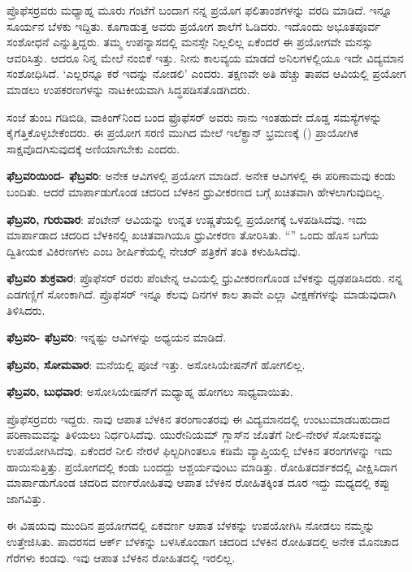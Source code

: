 ಪ್ರೊಫೆಸರ್‍ರವರು ಮಧ್ಯಾಹ್ನ ಮೂರು ಗಂಟೆಗೆ ಬಂದಾಗ ನನ್ನ ಪ್ರಯೊಗ ಫಲಿತಾಂಶಗಳನ್ನು ವರದಿ ಮಾಡಿದೆ. ಇನ್ನೂ ಸೂರ್ಯನ ಬೆಳಕು ಇದ್ದಿತು. ಕೂಗಾಡುತ್ತ ಅವರು ಪ್ರಯೋಗ ಶಾಲೆಗೆ ಓಡಿದರು. ಇದೊಂದು ಅಭೂತಪೂರ್ವ ಸಂಶೋಧನೆ ಎನ್ನುತ್ತಿದ್ದರು. ತಮ್ಮ ಉಪನ್ಯಾಸದಲ್ಲಿ ಮನಸ್ಸೇ ನಿಲ್ಲಲಿಲ್ಲ ಏಕೆಂದರೆ ಈ ಪ್ರಯೋಗವೇ ಮನಸ್ಸು ಆವರಿಸಿತ್ತು. ಆದರೂ ನಿನ್ನ ಮೇಲೆ ನಂಬಿಕೆ ಇತ್ತು. ನೀನು ಕಾಲವ್ಯಯ ಮಾಡದೆ ಅನಿಲಗಳಲ್ಲಿಯೂ ಇದೇ ವಿದ್ಯಮಾನ ಸಂಶೋಧಿಸಿದೆ. ‘ಎಲ್ಲರನ್ನೂ ಕರೆ ಇದನ್ನು ನೋಡಲಿ’ ಎಂದರು. ತಕ್ಷಣವೇ ಅತಿ ಹೆಚ್ಚು ತಾಪದ ಆವಿಯಲ್ಲಿ ಪ್ರಯೋಗ ಮಾಡಲು ಉಪಕರಣಗಳನ್ನು ನಾಟಕೀಯವಾಗಿ ಸಿದ್ಧಪಡಿಸತೊಡಗಿದರು.

ಸಂಜೆ ತುಂಬ ಗಡಿಬಿಡಿ, ವಾಕಿಂಗ್‍ನಿಂದ ಬಂದ ಫ್ರೊಫೆಸರ್ ಅವರು ನಾನು ಇಂತಹುದೇ ದೊಡ್ಡ ಸಮಸ್ಯೆಗಳನ್ನು ಕೈಗೆತ್ತಿಕೊಳ್ಳಬೇಕೆಂದರು. ಈ ಪ್ರಯೋಗ ಸರಣಿ ಮುಗಿದ ಮೇಲೆ ಇಲೆಕ್ಟ್ರಾನ್ ಭ್ರಮಣಕ್ಕೆ () ಪ್ರಾಯೋಗಿಕ ಸಾಕ್ಷವೊದಗಿಸುವುದಕ್ಕೆ ಅಣಿಯಾಗಬೇಕು ಎಂದರು.

\textbf{ ಫೆಬ್ರವರಿಯಿಂದ- ಫೆಬ್ರವರಿ}: ಅನೇಕ ಆವಿಗಳಲ್ಲಿ ಪ್ರಯೋಗ ಮಾಡಿದೆ. ಅನೇಕ ಆವಿಗಳಲ್ಲಿ ಈ ಪರಿಣಾಮವು ಕಂಡು ಬಂದಿತು. ಆದರೆ ಮಾರ್ಪಾಡುಗೊಂಡ ಚದರಿದ ಬೆಳಕಿನ ಧ್ರುವೀಕರಣದ ಬಗ್ಗೆ ಖಚಿತವಾಗಿ ಹೇಳಲಾಗುವುದಿಲ್ಲ.

\textbf{ ಫೆಬ್ರವರಿ, ಗುರುವಾರ}: ಪೆಂಟೇನ್ ಆವಿಯನ್ನು ಉನ್ನತ ಉಷ್ಣತೆಯಲ್ಲಿ ಪ್ರಯೋಗಕ್ಕೆ ಒಳಪಡಿಸಿದೆವು. ಇದು ಮಾರ್ಪಾಡಾದ ಚದರಿದ ಬೆಳಕಿನಲ್ಲಿ ಖಚಿತವಾಗಿಯೂ ಧ್ರುವೀಕರಣ ತೋರಿಸಿತು. “\textit{}” ಒಂದು ಹೊಸ ಬಗೆಯ ದ್ವಿತೀಯಕ ವಿಕಿರಣಗಳು ಎಂಬ ಶೀರ್ಷಿಕೆಯಲ್ಲಿ ನೇಚರ್ ಪತ್ರಿಕೆಗೆ ತಂತಿ ಕಳುಹಿಸಿದೆವು.

\textbf{ ಫೆಬ್ರವರಿ ಶುಕ್ರವಾರ}: ಪ್ರೊಫೆಸರ್ ರವರು ಪೆಂಟೇನ್ನ ಆವಿಯಲ್ಲಿ ಧ್ರುವೀಕರಣಗೊಂಡ ಬೆಳಕನ್ನು ಧೃಢಪಡಿಸಿದರು. ನನ್ನ ಎಡಗಣ್ಣಿಗೆ ಸೋಂಕಾಗಿದೆ. ಪ್ರೊಫೆಸರ್ ಇನ್ನೂ ಕೆಲವು ದಿನಗಳ ಕಾಲ ತಾವೇ ಎಲ್ಲಾ ವೀಕ್ಷಣೆಗಳನ್ನು ಮಾಡುವುದಾಗಿ ತಿಳಿಸಿದರು. 

\textbf{ ಫೆಬ್ರವರಿ- ಫೆಬ್ರವರಿ}: ಇನ್ನಷ್ಟು ಆವಿಗಳನ್ನು ಅಧ್ಯಯನ ಮಾಡಿದೆ.

\textbf{ ಫೆಬ್ರವರಿ, ಸೋಮವಾರ}: ಮನೆಯಲ್ಲಿ ಪೂಜೆ ಇತ್ತು. ಅಸೋಸಿಯೇಷನ್‍ಗೆ ಹೋಗಲಿಲ್ಲ.

\textbf{ ಫೆಬ್ರವರಿ, ಬುಧವಾರ}: ಅಸೋಸಿಯೇಷನ್‍ಗೆ ಮಧ್ಯಾಹ್ನ ಹೋಗಲು ಸಾಧ್ಯವಾಯಿತು.

ಪ್ರೊಫೆಸರ್‍ರವರು ಇದ್ದರು. ನಾವು ಆಪಾತ ಬೆಳಕಿನ ತರಂಗಾಂತರವು ಈ ವಿದ್ಯಮಾನದಲ್ಲಿ ಉಂಟುಮಾಡಬಹುದಾದ ಪರಿಣಾಮವನ್ನು ತಿಳಿಯಲು ನಿರ್ಧರಿಸಿದೆವು. ಯುರೇನಿಯಮ್ ಗ್ಲಾಸ್‍ನ ಜೊತೆಗೆ ನೀಲಿ-ನೇರಳೆ ಸೋಸುಕವನ್ನು ಉಪಯೋಗಿಸಿದೆವು. ಏಕೆಂದರೆ ನೀಲಿ ನೇರಳೆ ಫಿಲ್ಟರಿಗಿಂತಲೂ ಕಡಿಮೆ ವ್ಯಾಪ್ತಿಯಲ್ಲಿ ಬೆಳಕಿನ ತರಂಗಗಳನ್ನು ಇದು ಹಾಯಿಸುತ್ತಿತ್ತು. ಪ್ರಯೋಗದಲ್ಲಿ ಕಂಡು ಬಂದದ್ದು ಆಶ್ಚರ್ಯವುಂಟು ಮಾಡಿತ್ತು. ರೋಹಿತದರ್ಶಕದಲ್ಲಿ ವೀಕ್ಷಿಸಿದಾಗ ಮಾರ್ಪಾಡುಗೊಂಡ ಚದರಿದ ವರ್ಣರೋಹಿತವು ಆಪಾತ ಬೆಳಕಿನ ರೋಹಿತಕ್ಕಿಂತ ದೂರ ಇದ್ದು ಮಧ್ಯದಲ್ಲಿ ಕಪ್ಪು ಜಾಗವಿತ್ತು.

ಈ ವಿಷಯವು ಮುಂದಿನ ಪ್ರಯೋಗದಲ್ಲಿ ಏಕವರ್ಣ ಆಪಾತ ಬೆಳಕನ್ನು ಉಪಯೋಗಿಸಿ ನೋಡಲು ನಮ್ಮನ್ನು ಉತ್ತೇಜಿಸಿತು. ಪಾದರಸದ ಆರ್ಕ್ ಬೆಳಕನ್ನು ಬಳಸಿಕೊಂಡಾಗ ಚದರಿದ ಬೆಳಕಿನ ರೋಹಿತದಲ್ಲಿ ಅನೇಕ ಮೊನಚಾದ ಗೆರೆಗಳು ಕಂಡವು. ಇವು ಆಪಾತ ಬೆಳಕಿನ ರೋಹಿತದಲ್ಲಿ ಇರಲಿಲ್ಲ.

